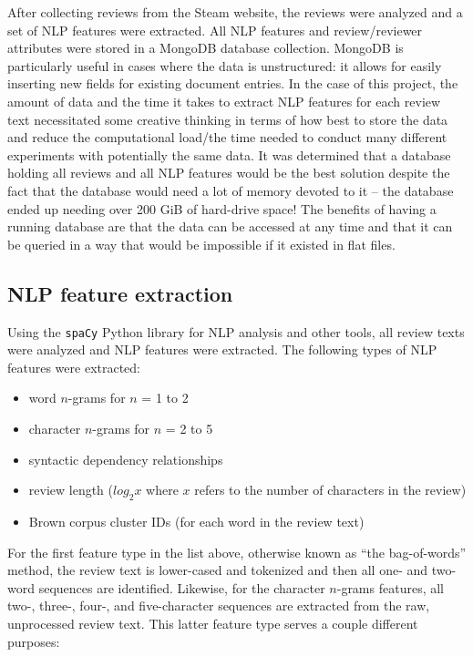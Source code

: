 \documentclass[9pt]{article}
\begin{document}
After collecting reviews from the Steam website, the reviews were analyzed and a set of NLP features were extracted. All NLP features and review/reviewer attributes were stored in a MongoDB database collection. MongoDB is particularly useful in cases where the data is unstructured: it allows for easily inserting new fields for existing document entries. In the case of this project, the amount of data and the time it takes to extract NLP features for each review text necessitated some creative thinking in terms of how best to store the data and reduce the computational load/the time needed to conduct many different experiments with potentially the same data. It was determined that a database holding all reviews and all NLP features would be the best solution despite the fact that the database would need a lot of memory devoted to it -- the database ended up needing over 200 GiB of hard-drive space! The benefits of having a running database are that the data can be accessed at any time and that it can be queried in a way that would be impossible if it existed in flat files.

\subsection{NLP feature extraction}

Using the {\tt spaCy} Python library for NLP analysis and other tools, all review texts were analyzed and NLP features were extracted. The following types of NLP features were extracted:

\begin{itemize}
\item word $n$-grams for $n$ = 1 to 2
\item character $n$-grams for $n$ = 2 to 5
\item syntactic dependency relationships
\item review length ($log_2 x$ where $x$ refers to the number of characters in the review)
\item Brown corpus cluster IDs (for each word in the review text)
\end{itemize}

For the first feature type in the list above, otherwise known as ``the bag-of-words'' method, the review text is lower-cased and tokenized and then all one- and two-word sequences are identified. Likewise, for the character $n$-grams features, all two-, three-, four-, and five-character sequences are extracted from the raw, unprocessed review text. This latter feature type serves a couple different purposes:
\end{document}
